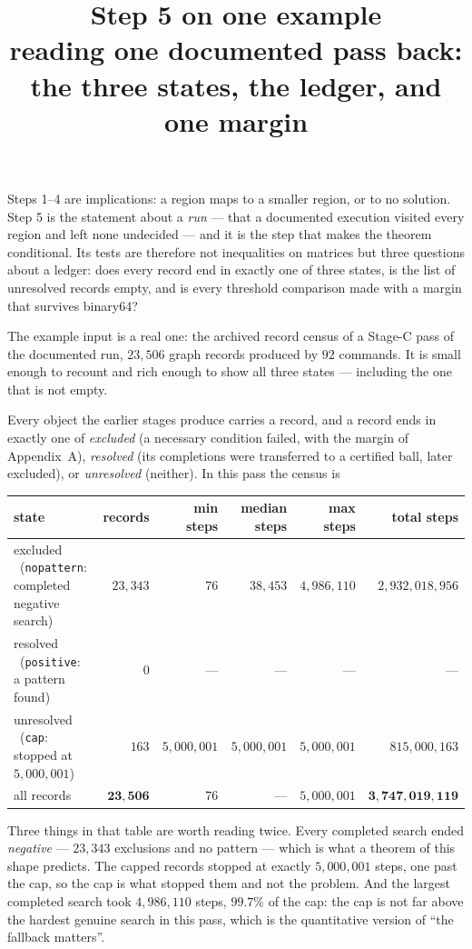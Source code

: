 \documentclass[11pt]{article}
\title{\bfseries Step 5 on one example\\[4pt]
\large\normalfont reading one documented pass back: the three states, the ledger, and one margin}
\author{}\date{}
\newcommand{\key}[1]{\par\smallskip\noindent{\bfseries #1}\par\nobreak\vspace{-2pt}}
\begin{document}
\maketitle
\vspace{-2.6em}

\noindent
Steps 1--4 are implications: a region maps to a smaller region, or to no solution. Step 5 is the
statement about a \emph{run} --- that a documented execution visited every region and left none
undecided --- and it is the step that makes the theorem conditional. Its tests are therefore not
inequalities on matrices but three questions about a ledger: does every record end in exactly one of
three states, is the list of unresolved records empty, and is every threshold comparison made with a
margin that survives binary64?

\smallskip
\noindent
The example input is a real one: the archived record census of a Stage-C pass of the documented run,
$23{,}506$ graph records produced by $92$ commands. It is small enough to recount and rich enough to
show all three states --- including the one that is not empty.

\key{1.\ The three states, counted}
Every object the earlier stages produce carries a record, and a record ends in exactly one of
\emph{excluded} (a necessary condition failed, with the margin of Appendix~A), \emph{resolved} (its
completions were transferred to a certified ball, later excluded), or \emph{unresolved} (neither).
In this pass the census is
\begin{center}\small
\begin{tabular}{@{}lrrrrr@{}}
\toprule
state & records & min steps & median steps & max steps & total steps\\
\midrule
excluded \ (\texttt{nopattern}: completed negative search) & $23{,}343$ & $76$ & $38{,}453$ & $4{,}986{,}110$ & $2{,}932{,}018{,}956$\\
resolved \ (\texttt{positive}: a pattern found) & $0$ & --- & --- & --- & ---\\
unresolved \ (\texttt{cap}: stopped at $5{,}000{,}001$) & $163$ & $5{,}000{,}001$ & $5{,}000{,}001$ & $5{,}000{,}001$ & $815{,}000{,}163$\\
\midrule
all records & $\mathbf{23{,}506}$ & $76$ & --- & $5{,}000{,}001$ & $\mathbf{3{,}747{,}019{,}119}$\\
\bottomrule
\end{tabular}
\end{center}
Three things in that table are worth reading twice. Every completed search ended \emph{negative} ---
$23{,}343$ exclusions and no pattern --- which is what a theorem of this shape predicts. The capped
records stopped at exactly $5{,}000{,}001$ steps, one past the cap, so the cap is what stopped them and
not the problem. And the largest completed search took $4{,}986{,}110$ steps, $99.7\%$ of the cap:
the cap is not far above the hardest genuine search in this pass, which is the quantitative version of
``the fallback matters''.
\end{document}
